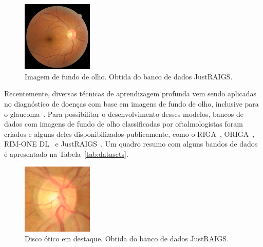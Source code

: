 \documentclass[12pt]{article}
\begin{document}
\begin{figure}[htb]
 \centering
 \includegraphics[width=0.3\textwidth]{images/TRAIN000004_cut.JPG}
 \caption{Imagem de fundo de olho. Obtida do banco de dados JustRAIGS.}
 \label{fig:fundus}
\end{figure}

Recentemente, diversas técnicas de aprendizagem profunda vem sendo aplicadas no diagnóstico de doenças com base em imagens de fundo de olho, inclusive para o glaucoma~\cite{li_review_2021}. Para possibilitar o desenvolvimento desses modelos, bancos de dados com imagens de fundo de olho classificadas por oftalmologistas foram criados e alguns deles disponibilizados publicamente, como o RIGA~\cite{riga}, ORIGA~\cite{origa}, RIM-ONE DL~\cite{RIMONEDL} e JustRAIGS~\cite{justraigs}. Um quadro resumo com alguns bandos de dados é apresentado na Tabela~\ref{tab:datasets}.

\begin{figure}[htb]
 \centering
 \includegraphics[width=0.3\textwidth]{images/disk.jpg}
 \caption{Disco ótico em destaque. Obtida do banco de dados JustRAIGS.}
 \label{fig:disk}
\end{figure}
\end{document}

